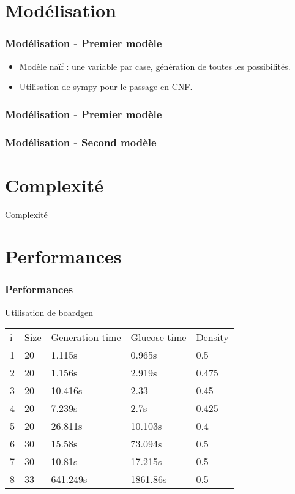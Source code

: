 \documentclass[12pt]{beamer}
\begin{document}
\section[]{Modélisation}
\begin{frame}
\frametitle{Modélisation - Premier modèle}

\begin{itemize}
    \item Modèle naïf : une variable par case, génération de toutes les possibilités. 
    \item Utilisation de sympy pour le passage en CNF.
\end{itemize}

\end{frame}

\begin{frame}
\frametitle{Modélisation - Premier modèle}
\end{frame}


\begin{frame}
\frametitle{Modélisation - Second modèle}

\end{frame}
\section[]{Complexité}
\begin{frame}{Complexité}
\end{frame}


\section[]{Performances}
\begin{frame}
\frametitle{Performances}
Utilisation de boardgen
\begin{table}[]
\begin{tabular}{lllll}
i & Size & Generation time & Glucose time & Density \\
1 & 20     & 1.115s                 & 0.965s           & 0.5     \\
2 & 20     & 1.156s                 & 2.919s           & 0.475   \\
3 & 20     & 10.416s                & 2.33             & 0.45    \\
4 & 20     & 7.239s                 & 2.7s             & 0.425   \\
5 & 20     & 26.811s                & 10.103s          & 0.4     \\
6 & 30     & 15.58s                 & 73.094s          & 0.5     \\
7 & 30     & 10.81s                 & 17.215s          & 0.5     \\
8 & 33     & 641.249s              & 1861.86s        & 0.5    
\end{tabular}
\end{table}


\end{frame}
\end{document}
